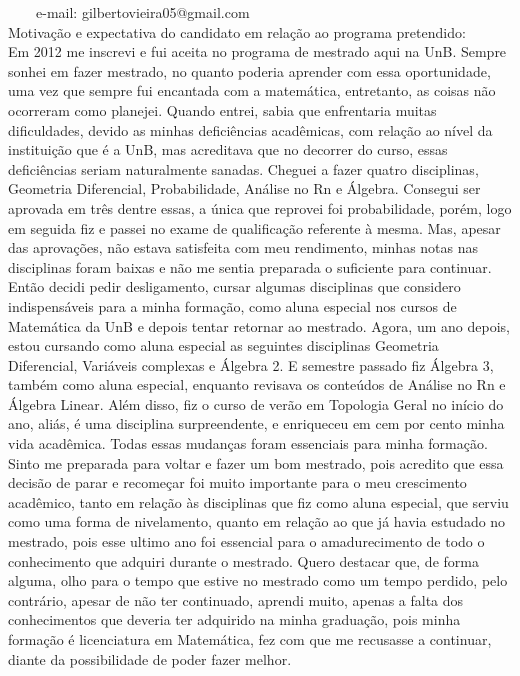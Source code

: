 \documentclass[11pt]{article}
\begin{document}
\ \ \ \ e-mail: gilbertovieira05@gmail.com
\\[0.2cm]
Motivação e expectativa do candidato em relação ao programa pretendido:
\\Em 2012 me inscrevi e fui aceita no programa de mestrado aqui na UnB. Sempre sonhei em fazer mestrado, no quanto poderia aprender com essa oportunidade, uma vez que sempre fui encantada com a matemática, entretanto, as coisas não ocorreram como planejei. Quando entrei, sabia que enfrentaria muitas dificuldades, devido as minhas deficiências acadêmicas, com relação ao nível da instituição que é a UnB, mas acreditava que no decorrer do curso, essas deficiências seriam naturalmente sanadas.
Cheguei a fazer quatro disciplinas, Geometria Diferencial, Probabilidade, Análise no Rn e Álgebra. Consegui ser aprovada em três dentre essas, a única que reprovei foi probabilidade, porém, logo em seguida fiz e passei no exame de qualificação referente à mesma. Mas, apesar das aprovações, não estava satisfeita com meu rendimento, minhas notas nas disciplinas foram baixas e não me sentia preparada o suficiente para continuar.
Então decidi pedir desligamento, cursar algumas disciplinas que considero indispensáveis para a minha formação, como aluna especial nos cursos de Matemática da UnB e depois tentar retornar ao mestrado.
Agora, um ano depois, estou cursando como aluna especial as seguintes disciplinas Geometria Diferencial, Variáveis complexas e Álgebra 2. E semestre passado fiz Álgebra 3, também como aluna especial, enquanto revisava os conteúdos de Análise no Rn e Álgebra Linear. Além disso, fiz o curso de verão em Topologia Geral no início do ano, aliás, é uma disciplina surpreendente, e enriqueceu em cem por cento minha vida acadêmica.
Todas essas mudanças foram essenciais para minha formação.
Sinto me preparada para voltar e fazer um bom mestrado, pois acredito que essa decisão de parar e recomeçar foi muito importante para o meu crescimento acadêmico, tanto em relação às disciplinas que fiz como aluna especial, que serviu como uma forma de nivelamento, quanto em relação ao que já havia estudado no mestrado, pois esse ultimo ano foi essencial para o amadurecimento de todo o conhecimento que adquiri durante o mestrado.
Quero destacar que, de forma alguma, olho para o tempo que estive no mestrado como um tempo perdido, pelo contrário, apesar de não ter continuado, aprendi muito, apenas a falta dos conhecimentos que deveria ter adquirido na minha graduação, pois minha formação é licenciatura em Matemática, fez com que me recusasse a continuar, diante da possibilidade de poder fazer melhor. 
\end{document}
